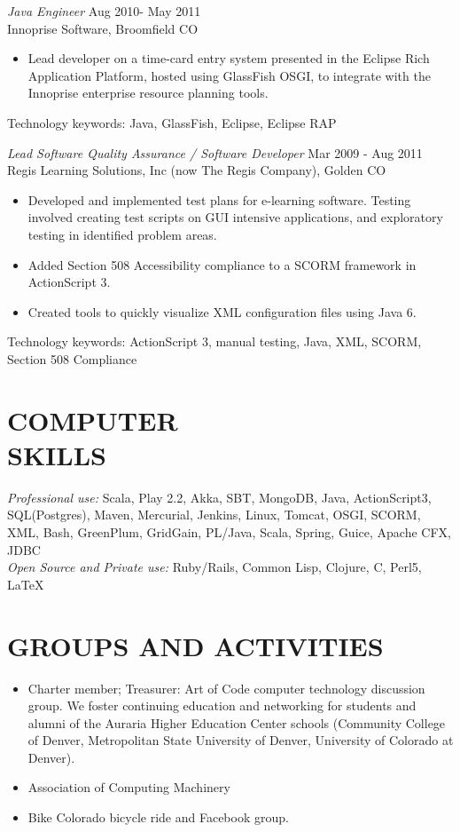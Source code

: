 \documentclass[line,margin]{res}
\begin{document}
\begin{resume}
 
                {\sl Java Engineer} \hfill          Aug 2010- May 2011 \\
                Innoprise Software, Broomfield CO
                 \begin{itemize}  \itemsep -2pt %
                 \item Lead developer on a time-card entry system presented in the Eclipse Rich Application Platform, hosted using GlassFish OSGI, to integrate with the
		Innoprise enterprise resource planning tools.
\end{itemize} 
	     Technology keywords: Java, GlassFish, Eclipse, Eclipse RAP
                

                {\sl Lead Software Quality Assurance / Software Developer} \hfill        Mar 2009 - Aug 2011 \\
                Regis Learning Solutions, Inc (now The Regis Company), Golden CO
                  \begin{itemize}  \itemsep -2pt %
                   \item Developed and implemented test plans for e-learning software. Testing involved creating test scripts on GUI intensive applications, and exploratory testing in identified problem areas.
		\item Added Section 508 Accessibility compliance to a SCORM framework in ActionScript 3.
		\item Created tools to quickly visualize XML configuration files using Java 6.   
    \end{itemize} 
		Technology keywords: ActionScript 3, manual testing, Java, XML, SCORM, Section 508 Compliance
            
 \section{COMPUTER \\ SKILLS} {\sl Professional use:} Scala, Play 2.2, Akka, SBT, MongoDB, Java, ActionScript3, SQL(Postgres), Maven, Mercurial, Jenkins, Linux, Tomcat, OSGI, SCORM, XML, Bash, GreenPlum, GridGain, PL/Java, Scala, Spring, Guice, Apache CFX, JDBC  \\
                {\sl Open Source and Private use:} Ruby/Rails, Common Lisp, Clojure, C, Perl5, \LaTeX \\


\section{GROUPS AND ACTIVITIES}        
\begin{itemize}   \itemsep -2pt %
          \item Charter member; Treasurer: Art of Code computer technology discussion group. We foster continuing education and networking for students and alumni of the Auraria Higher Education Center schools (Community College of Denver, Metropolitan State University of Denver, University of Colorado at Denver).
\item	Association of Computing Machinery
\item Bike Colorado bicycle ride and Facebook group.


\end{itemize}
\end{resume}
\end{document}
